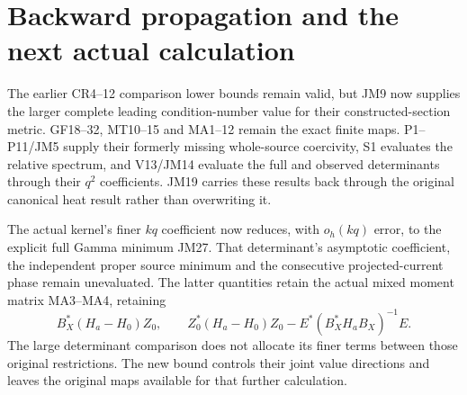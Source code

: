 \documentclass[11pt]{article}
\begin{document}
\section{Backward propagation and the next actual calculation}
The earlier CR4--12 comparison lower bounds remain valid, but JM9
now supplies the larger complete leading condition-number value
for their constructed-section metric. GF18--32, MT10--15 and MA1--12
remain the exact finite maps. P1--P11/JM5 supply their formerly
missing whole-source coercivity, S1 evaluates the relative spectrum,
and V13/JM14 evaluate the full and observed determinants through
their $q^2$ coefficients. JM19 carries these results back through
the original canonical heat result rather than overwriting it.

The actual kernel's finer $kq$ coefficient now reduces, with
$o_h(kq)$ error, to the explicit full Gamma minimum JM27.
That determinant's asymptotic coefficient, the independent proper
source minimum and the consecutive projected-current phase remain
unevaluated. The latter quantities retain the actual mixed
moment matrix MA3--MA4, retaining
\[
 B_X^*(H_a-H_0)Z_0,\qquad
 Z_0^*(H_a-H_0)Z_0-E^*(B_X^*H_aB_X)^{-1}E.\tag{JM20}
\]
The large determinant comparison does not allocate its finer terms
between those original restrictions. The new bound controls their
joint value directions and leaves the original maps available for
that further calculation.
\end{document}
